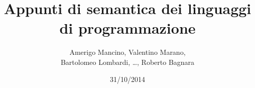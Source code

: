\documentclass[12pt,a4]{book}
\begin{document}
\title{Appunti di semantica dei linguaggi di programmazione}
\author{Amerigo Mancino, Valentino Marano, \\
        Bartolomeo Lombardi, \dots, Roberto Bagnara}
\date{31/10/2014}

\maketitle

\tableofcontents












\end{document}
